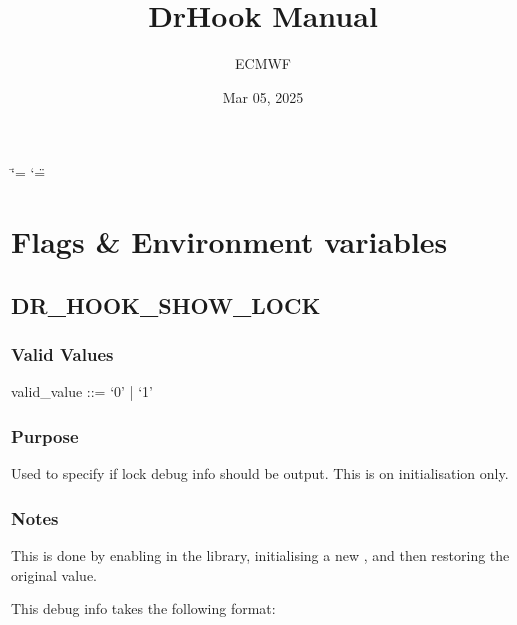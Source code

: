 \documentclass[letterpaper,10pt,english]{sphinxmanual}
\title{DrHook Manual}
\date{Mar 05, 2025}
\author{ECMWF}
\begin{document}
\ifdefined\shorthandoff
  \ifnum\catcode`\=\string=\active\shorthandoff{=}\fi
  \ifnum\catcode`\"=\active{}\fi
\fi

\pagestyle{empty}
\sphinxmaketitle
\pagestyle{plain}
\sphinxtableofcontents
\pagestyle{normal}
\label{\detokenize{index::doc}}


\sphinxstepscope


\chapter{Flags \& Environment variables}
\label{\detokenize{flag/flag:flags-environment-variables}}\label{\detokenize{flag/flag::doc}}

\section{DR\_HOOK\_SHOW\_LOCK}
\label{\detokenize{flag/flag:dr-hook-show-lock}}\label{\detokenize{flag/flag:id1}}

\subsection{Valid Values}
\label{\detokenize{flag/flag:valid-values}}
\begin{DUlineblock}{0em}
\item[] valid\_value ::= ‘0’ | ‘1’
\end{DUlineblock}


\subsection{Purpose}
\label{\detokenize{flag/flag:purpose}}
\sphinxAtStartPar
Used to specify if lock debug info should be output. This is on initialisation only.


\subsection{Notes}
\label{\detokenize{flag/flag:notes}}
\sphinxAtStartPar
This is done by enabling  in the  library, initialising a new , and then restoring the original value.

\begin{DUlineblock}{0em}
\item[] This debug info takes the following format:
\item[] 
\end{DUlineblock}
\end{document}
